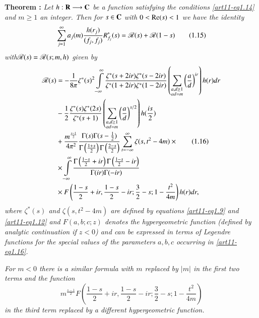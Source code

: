 \medskip
\noindent
{\bfseries Theorem :\label{art11-thm1}}
\textit{Let $h : \mathbf{R} \longrightarrow \mathbf{C}$ be a function satisfying the conditions \eqref{art11-eq1.14} and $m \geqslant 1$ an integer. Then for $s \in\mathbf{C}$ with $0 <\operatorname{Re} (s) <1$ we have the identity}
\begin{equation*}
\sum\limits^\infty_{j =1} a_j(m) \frac{h(r_j)}{(f_j, f_j)} R^\ast_{f_j} (s) = \mathscr{R}(s) + \mathscr{R}(1-s)
\tag{1.15}\label{art11-eq1.15}
\end{equation*}
\textit{with\pageoriginale $\mathscr{R}(s) = \mathscr{R} (s; m,h)$ given by }
\begin{align*}
\mathscr{R} (s) & = - \frac{1}{8 \pi} \zeta^\ast (s)^2 \int\limits^\infty_{-\infty} \frac{\zeta^\ast (s+ 2 ir) \zeta^\ast (s-2ir)}{\zeta^\ast (1+ 2 ir ) \zeta^\ast (1-2 ir)} \left(\sum\limits_{\substack{a, d \geq 1\\ ad =m}} \left(\frac{a}{d} \right)^{ir}  \right) h (r) dr \\
&- \frac{1}{2} \frac{\zeta^\ast (s) \zeta^\ast (2s)}{\zeta^\ast (s+1)} \left(\sum\limits_{\substack{a, d \geq 1\\ ad =m}} \left(\frac{a}{d} \right)^{s/2}  \right) h (\frac{is}{2}) \\
&+ \frac{m^{\frac{s-1}{2}}}{4\pi^2} \frac{\Gamma (s) \Gamma (s - \frac{1}{2})}{\Gamma \left(\frac{1+s}{2} \right) \Gamma \left(\frac{2-s}{2} \right)} \sum\limits^\infty_{t = - \infty} \zeta(s, t^2 - 4 m) \times \tag{1.16}\label{art11-eq1.16}\\
& \times \int\limits^\infty_{-\infty} \frac{\Gamma \left(\frac{1-s}{2} + ir \right) \Gamma\left(\frac{1-s}{2} - ir \right) }{\Gamma (ir) \Gamma (-ir)}\\
& \times F \left(\frac{1-s}{2} + ir, \frac{1-s}{2} - ir; \frac{3}{2} - s ; 1 - \frac{t^2}{4 m} \right) h (r) dr, 
\end{align*}
\textit{where $\zeta^\ast(s)$ and $\zeta (s, t^2 - 4 m)$ are defined by equations \eqref{art11-eq1.9} and \eqref{art11-eq1.12} and $F(a, b; c; z)$ denotes the hypergeometric function (defined by analytic continuation if $z<0$) and can be expressed in terms of Legendre functions for the special values of the parameters $a, b, c$ occurring in \eqref{art11-eq1.16}.}

\textit{For $m<0$ there is a similar formula with $m$ replaced by $|m|$ in the first two terms and the function 
$$
m^{\frac{s-1}{2}} F \left(\dfrac{1-s}{2} + ir, \dfrac{1-s}{2} -ir ; \dfrac{3}{2} - s; 1 - \dfrac{t^2}{4m} \right)
$$ 
in the third term replaced by a different hypergeometric function.}

